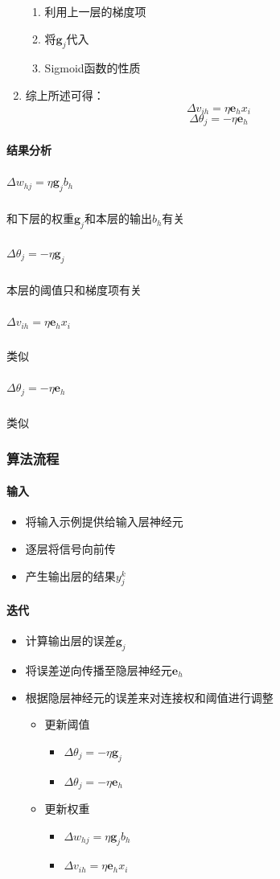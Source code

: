 \documentclass[UTF8]{ctexart}
\begin{document}
\begin{enumerate}
\begin{enumerate}
		\item 利用上一层的梯度项
		\item 将$\pmb g_j$代入
		\item Sigmoid函数的性质
	\end{enumerate}
	\item 综上所述可得：$$\varDelta v_{ih} = \eta\pmb e_hx_i$$
	$$\varDelta\theta_j = -\eta\pmb e_h$$
\end{enumerate}
\paragraph{结果分析}
\subparagraph{$\varDelta w_{hj} = \eta\pmb g_jb_h$ }
和下层的权重$\pmb g_j$和本层的输出$b_h$有关
\subparagraph{$\varDelta\theta_j = -\eta\pmb g_j$}
本层的阈值只和梯度项有关
\subparagraph{$\varDelta v_{ih} = \eta\pmb e_hx_i$}
类似
\subparagraph{$\varDelta\theta_j = -\eta\pmb e_h$}
类似

\subsubsection{算法流程}
\paragraph{输入}
\begin{itemize}
	\item 将输入示例提供给输入层神经元
	\item 逐层将信号向前传
	\item 产生输出层的结果$y_j^k$
\end{itemize}
\paragraph{迭代}
\begin{itemize}
	\item 计算输出层的误差$\pmb g_j$
	\item 将误差逆向传播至隐层神经元$\pmb e_h$
	\item 根据隐层神经元的误差来对连接权和阈值进行调整 \begin{itemize}
		\item 更新阈值 \begin{itemize}
			\item $\varDelta\theta_j = -\eta\pmb g_j$
			\item $\varDelta\theta_j = -\eta\pmb e_h$
		\end{itemize}
		\item 更新权重 \begin{itemize}
			\item $\varDelta w_{hj} = \eta\pmb g_jb_h$
			\item $\varDelta v_{ih} = \eta\pmb e_hx_i$
		\end{itemize}
	\end{itemize}
\end{itemize}
\end{document}
